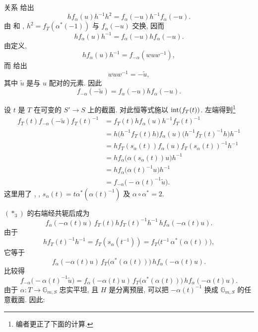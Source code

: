 关系 \textup{} 给出
\[
 h f_\alpha(u)h^{-1}h^2
 =
 f_\alpha(-u)h^{-1}f_\alpha(-u).
\]
由 \textup{} 和 \textup{}, \(h^2=f_T(\alpha^\ast(-1))\) 与 \(f_\alpha(-u)\) 交换, 因而
\[
 h f_\alpha(u)h^{-1}
 =
 f_\alpha(-u)h f_\alpha(-u).
\]
由定义,
\[
 h f_\alpha(u)h^{-1}=f_{-\alpha}(wuw^{-1}),
\]
而  给出
\begin{equation}
\tag{\(\ast_2\)}\label{sga3:xx:theorem:6-2:equation:ast-2}
 wuw^{-1}=-\widetilde u,
\end{equation}
其中 \(\widetilde u\) 是与 \(u\) 配对的元素. 因此
\begin{equation}
\tag{\(\ast_3\)}\label{sga3:xx:theorem:6-2:equation:ast-3}
 f_{-\alpha}(-\widetilde u)
 =
 f_\alpha(-u)h f_\alpha(-u).
\end{equation}

设 \(t\) 是 \(T\) 在可变的 \(S'\to S\) 上的截面. 对此恒等式施以 \(\operatorname{int}(f_T(t))\). 左端得到\footnote{编者更正了下面的计算.}
\[
\begin{aligned}
 f_T(t)f_{-\alpha}(-\widetilde u)f_T(t)^{-1}
 &=
 f_T(t)h f_\alpha(u)h^{-1}f_T(t)^{-1}\\
 &=
 h\bigl(h^{-1}f_T(t)h\bigr)f_\alpha(u)
   \bigl(h^{-1}f_T(t)^{-1}h\bigr)h^{-1}\\
 &=
 h f_T(s_\alpha(t))f_\alpha(u)
   f_T(s_\alpha(t))^{-1}h^{-1}\\
 &=
 h f_\alpha\bigl(\alpha(s_\alpha(t))u\bigr)h^{-1}\\
 &=
 h f_\alpha\bigl(\alpha(t)^{-1}u\bigr)h^{-1}\\
 &=
 f_{-\alpha}\bigl(-\alpha(t)^{-1}\widetilde u\bigr).
\end{aligned}
\]
这里用了 \textup{}, \textup{}, \(s_\alpha(t)=t\alpha^\ast(\alpha(t)^{-1})\) 及 \(\alpha\circ\alpha^\ast=2\).

\((\ast_3)\) 的右端经共轭后成为
\[
 f_\alpha(-\alpha(t)u)\,
 f_T(t)h f_T(t)^{-1}h^{-1}\,
 h f_\alpha(-\alpha(t)u).
\]
由于
\[
 h f_T(t)^{-1}h^{-1}
 =f_T(s_\alpha(t^{-1}))
  =f_T\bigl(t^{-1}\,\alpha^\ast(\alpha(t))\bigr),
\]
它等于
\[
 f_\alpha(-\alpha(t)u)\,
 f_T\bigl(\alpha^\ast(\alpha(t))\bigr)\,
 h f_\alpha(-\alpha(t)u).
\]
比较得
\[
 f_{-\alpha}\bigl(-\alpha(t)^{-1}\widetilde u\bigr)
 =
 f_\alpha(-\alpha(t)u)\,
 f_T\bigl(\alpha^\ast(\alpha(t))\bigr)\,
 h f_\alpha(-\alpha(t)u).
\]
由于 \(\alpha\colon T\to\mathbb G_{m,S}\) 忠实平坦, 且 \(H\) 是分离预层, 可以把 \(-\alpha(t)^{-1}\) 换成 \(\mathbb G_{m,S}\) 的任意截面. 因此:


